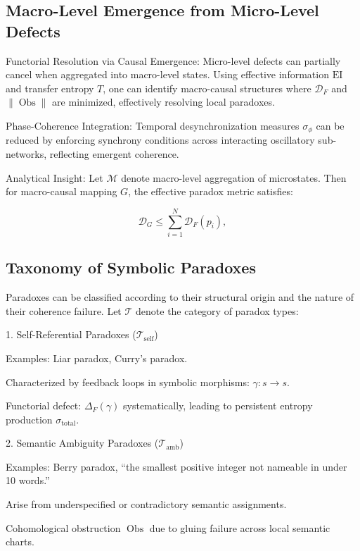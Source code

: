 \documentclass[12pt]{article}
\theoremstyle{plain}
\begin{document}
\subsection{Macro-Level Emergence from Micro-Level Defects}

Functorial Resolution via Causal Emergence: Micro-level defects can partially cancel when aggregated into macro-level states. Using effective information \(\text{EI}\) and transfer entropy \(T\), one can identify macro-causal structures where \(\mathcal{D}_F\) and \(\|\operatorname{Obs}\|\) are minimized, effectively resolving local paradoxes.

Phase-Coherence Integration: Temporal desynchronization measures \(\sigma_\phi\) can be reduced by enforcing synchrony conditions across interacting oscillatory sub-networks, reflecting emergent coherence.

Analytical Insight: Let \(\mathcal{M}\) denote macro-level aggregation of microstates. Then for macro-causal mapping \(G\), the effective paradox metric satisfies:

\begin{equation}
\mathcal{D}_G \leq \sum_{i=1}^N \mathcal{D}_F(p_i),
\end{equation}

\subsection{Taxonomy of Symbolic Paradoxes}

Paradoxes can be classified according to their structural origin and the nature of their coherence failure. Let \(\mathcal{T}\) denote the category of paradox types:

1. Self-Referential Paradoxes (\(\mathcal{T}_\text{self}\))

Examples: Liar paradox, Curry’s paradox.

Characterized by feedback loops in symbolic morphisms: \(\gamma: s \to s\).

Functorial defect: \(\Delta_F(\gamma)\) systematically, leading to persistent entropy production \(\sigma_{\mathrm{total}}\).

2. Semantic Ambiguity Paradoxes (\(\mathcal{T}_\text{amb}\))

Examples: Berry paradox, “the smallest positive integer not nameable in under 10 words.”

Arise from underspecified or contradictory semantic assignments.

Cohomological obstruction \(\operatorname{Obs}\) due to gluing failure across local semantic charts.
\end{document}
